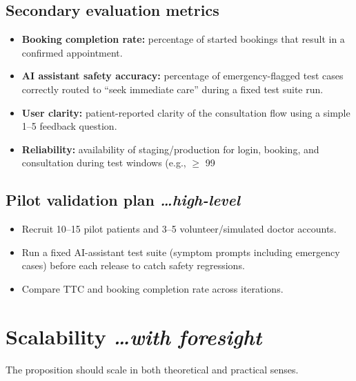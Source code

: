 \documentclass[11pt,a4paper]{article}
\newcommand{\BvrHint}[1]{%
{\normalfont\normalsize\itshape\hfill #1}}
\begin{document}
\subsection{Secondary evaluation metrics}
\begin{itemize}[leftmargin=0.7cm]
\item \textbf{Booking completion rate:} percentage of started bookings that result in a confirmed appointment.
\item \textbf{AI assistant safety accuracy:} percentage of emergency-flagged test cases correctly routed to ``seek immediate care'' during a fixed test suite run.
\item \textbf{User clarity:} patient-reported clarity of the consultation flow using a simple 1--5 feedback question.
\item \textbf{Reliability:} availability of staging/production for login, booking, and consultation during test windows (e.g., $\ge$ 99%
\end{itemize}

\subsection{Pilot validation plan %
\BvrHint{\ldots high-level}}
\begin{itemize}[leftmargin=0.7cm]
\item Recruit 10--15 pilot patients and 3--5 volunteer/simulated doctor accounts.
\item Run a fixed AI-assistant test suite (symptom prompts including emergency cases) before each release to catch safety regressions.
\item Compare TTC and booking completion rate across iterations.
\end{itemize}

\section{Scalability %
\BvrHint{\ldots with foresight}}
The proposition should scale in both theoretical and
practical senses.
\end{document}
